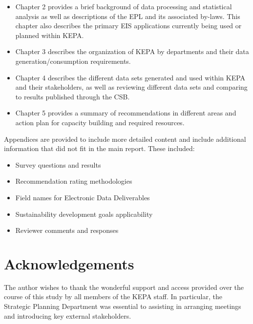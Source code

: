 \begin{itemize}
\item Chapter 2 provides a brief background of data processing and statistical analysis as well as descriptions of the EPL and its associated by-laws. This chapter also describes the primary EIS applications currently being used or planned within KEPA.
\item Chapter 3 describes the organization of KEPA by departments and their data generation/consumption requirements. 
\item Chapter 4 describes the different data sets generated and used within KEPA and their stakeholders, as well as reviewing different data sets and comparing to results published through the CSB.
\item Chapter 5 provides a summary of recommendations in different areas and action plan for capacity building and required resources.
\end{itemize}

Appendices are provided to include more detailed content and include additional information that did not fit in the main report.  These included:

\begin{itemize}
\item{Survey questions and results}
\item{Recommendation rating methodologies}
\item{Field names for Electronic Data Deliverables}
\item{Sustainability development goals applicability}
\item{Reviewer comments and responses}
\end{itemize}

\section{Acknowledgements}
The author wishes to thank the wonderful support and access provided over the course of this study by all members of the KEPA staff. In particular, the Strategic Planning Department was essential to assisting in arranging meetings and introducing key external stakeholders.